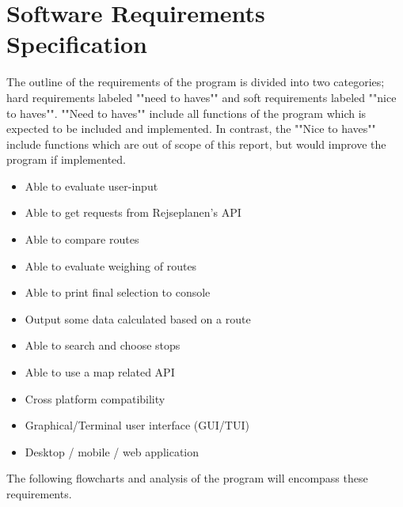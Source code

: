 \section{Software Requirements Specification}\label{sec:software-requirements-specification}

The outline of the requirements of the program is divided into two categories; hard requirements labeled ""need to
haves"" and soft requirements labeled ""nice to haves"".
""Need to haves"" include all functions of the program which is expected to be included and implemented.
In contrast, the ""Nice to haves"" include functions which are out of scope of this report, but would improve the
program if implemented.

\begin{itemize}[label=Need to haves]
    \item Able to evaluate user-input
    \item Able to get requests from Rejseplanen’s API
    \item Able to compare routes
    \item Able to evaluate weighing of routes
    \item Able to print final selection to console
    \item Output some data calculated based on a route
\end{itemize}

\begin{itemize}[label=Nice to haves]
    \item Able to search and choose stops
    \item Able to use a map related API
    \item Cross platform compatibility
    \item Graphical/Terminal user interface (GUI/TUI)
    \item Desktop / mobile / web application
\end{itemize}

The following flowcharts and analysis of the program will encompass these requirements.
